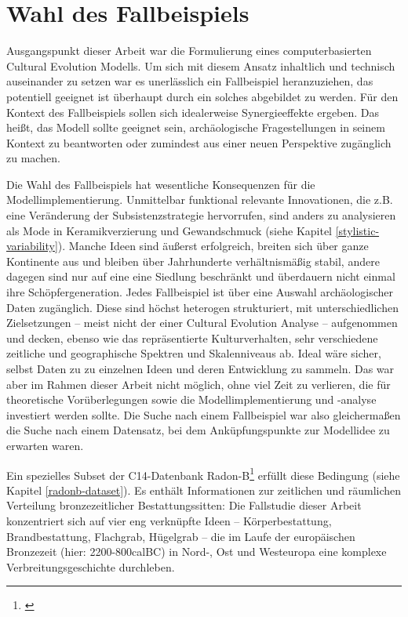 \documentclass[openany,twoside,twocolumn]{book}
\let\rmarkdownfootnote\footnote%
\def\footnote{\protect\rmarkdownfootnote}
\begin{document}
\hypertarget{wahl-des-fallbeispiels}{%
\section{Wahl des Fallbeispiels}\label{wahl-des-fallbeispiels}}

Ausgangspunkt dieser Arbeit war die Formulierung eines computerbasierten
Cultural Evolution Modells. Um sich mit diesem Ansatz inhaltlich und
technisch auseinander zu setzen war es unerlässlich ein Fallbeispiel
heranzuziehen, das potentiell geeignet ist überhaupt durch ein solches
abgebildet zu werden. Für den Kontext des Fallbeispiels sollen sich
idealerweise Synergieeffekte ergeben. Das heißt, das Modell sollte
geeignet sein, archäologische Fragestellungen in seinem Kontext zu
beantworten oder zumindest aus einer neuen Perspektive zugänglich zu
machen.

Die Wahl des Fallbeispiels hat wesentliche Konsequenzen für die
Modellimplementierung. Unmittelbar funktional relevante Innovationen,
die z.B. eine Veränderung der Subsistenzstrategie hervorrufen, sind
anders zu analysieren als Mode in Keramikverzierung und Gewandschmuck
(siehe Kapitel \ref{stylistic-variability}). Manche Ideen sind äußerst
erfolgreich, breiten sich über ganze Kontinente aus und bleiben über
Jahrhunderte verhältnismäßig stabil, andere dagegen sind nur auf eine
eine Siedlung beschränkt und überdauern nicht einmal ihre
Schöpfergeneration. Jedes Fallbeispiel ist über eine Auswahl
archäologischer Daten zugänglich. Diese sind höchst heterogen
strukturiert, mit unterschiedlichen Zielsetzungen -- meist nicht der
einer Cultural Evolution Analyse -- aufgenommen und decken, ebenso wie
das repräsentierte Kulturverhalten, sehr verschiedene zeitliche und
geographische Spektren und Skalenniveaus ab. Ideal wäre sicher, selbst
Daten zu zu einzelnen Ideen und deren Entwicklung zu sammeln. Das war
aber im Rahmen dieser Arbeit nicht möglich, ohne viel Zeit zu verlieren,
die für theoretische Vorüberlegungen sowie die Modellimplementierung und
-analyse investiert werden sollte. Die Suche nach einem Fallbeispiel war
also gleichermaßen die Suche nach einem Datensatz, bei dem
Anküpfungspunkte zur Modellidee zu erwarten waren.

Ein spezielles Subset der C14-Datenbank Radon-B\footnote{\textcite{jutta_kneisel_radon-b_2013}}
erfüllt diese Bedingung (siehe Kapitel \ref{radonb-dataset}). Es enthält
Informationen zur zeitlichen und räumlichen Verteilung bronzezeitlicher
Bestattungssitten: Die Fallstudie dieser Arbeit konzentriert sich auf
vier eng verknüpfte Ideen -- Körperbestattung, Brandbestattung,
Flachgrab, Hügelgrab -- die im Laufe der europäischen Bronzezeit (hier:
2200-800calBC) in Nord-, Ost und Westeuropa eine komplexe
Verbreitungsgeschichte durchleben.
\end{document}
